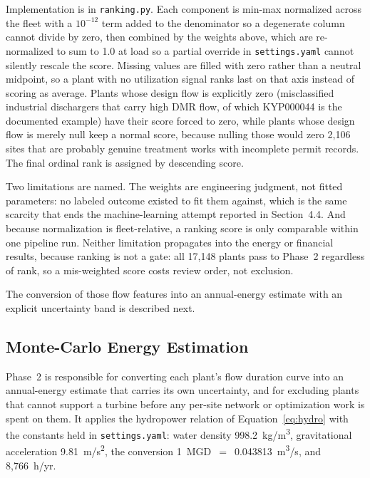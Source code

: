 \documentclass[12pt,letterpaper]{report}
\begin{document}
Implementation is in \texttt{ranking.py}. Each component is min-max normalized
across the fleet with a $10^{-12}$ term added to the denominator so a degenerate
column cannot divide by zero, then combined by the weights above, which are
re-normalized to sum to 1.0 at load so a partial override in
\texttt{settings.yaml} cannot silently rescale the score. Missing values are
filled with zero rather than a neutral midpoint, so a plant with no utilization
signal ranks last on that axis instead of scoring as average. Plants whose
design flow is explicitly zero (misclassified industrial dischargers that
carry high DMR flow, of which KYP000044 is the documented example) have their
score forced to zero, while plants whose design flow is merely null keep a normal
score, because nulling those would zero 2{,}106 sites that are probably
genuine treatment works with incomplete permit records. The final ordinal rank is
assigned by descending score.

Two limitations are named. The weights are engineering judgment, not fitted
parameters: no labeled outcome existed to fit them against, which is the same
scarcity that ends the machine-learning attempt reported in Section~4.4. And
because normalization is fleet-relative, a ranking score is only comparable
within one pipeline run. Neither limitation propagates into the energy or
financial results, because ranking is not a gate: all 17{,}148 plants pass to
Phase~2 regardless of rank, so a mis-weighted score costs review order, not
exclusion.

The conversion of those flow features into an annual-energy estimate with an explicit
uncertainty band is described next.

\subsection{Monte-Carlo Energy Estimation}

Phase~2 is responsible for converting each plant's flow duration curve into an
annual-energy estimate that carries its own uncertainty, and for excluding plants
that cannot support a turbine before any per-site network or optimization work is
spent on them. It applies the hydropower relation of Equation~\eqref{eq:hydro} with
the constants held in \texttt{settings.yaml}: water density 998.2~kg/m\textsuperscript{3},
gravitational acceleration 9.81~m/s\textsuperscript{2}, the conversion
1~MGD~$=$~0.043813~m\textsuperscript{3}/s, and 8{,}766~h/yr.
\end{document}
